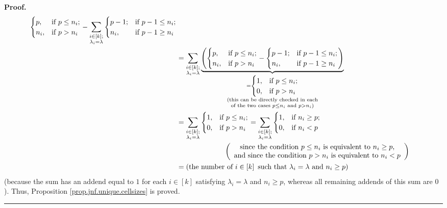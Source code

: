 \documentclass[numbers=enddot,12pt,final,onecolumn,notitlepage]{scrartcl}%
\numberwithin{exer}{subsection}
\theoremstyle{definition}
\newenvironment{proof}[1][Proof]{\noindent\textbf{#1.} }{\ \rule{0.5em}{0.5em}}
\let\sumnonlimits\sum
\renewcommand{\sum}{\sumnonlimits\limits}
\begin{document}
\begin{proof}
\begin{align*}
\begin{cases}
p, & \text{if }p\leq n_{i};\\
n_{i}, & \text{if }p>n_{i}%
\end{cases}
-\sum_{\substack{i\in\left[  k\right]  ;\\\lambda_{i}=\lambda}}%
\begin{cases}
p-1; & \text{if }p-1\leq n_{i};\\
n_{i}, & \text{if }p-1\geq n_{i}%
\end{cases}
\\
&  =\sum_{\substack{i\in\left[  k\right]  ;\\\lambda_{i}=\lambda
}}\underbrace{\left(
\begin{cases}
p, & \text{if }p\leq n_{i};\\
n_{i}, & \text{if }p>n_{i}%
\end{cases}
-%
\begin{cases}
p-1; & \text{if }p-1\leq n_{i};\\
n_{i}, & \text{if }p-1\geq n_{i}%
\end{cases}
\right)  }_{\substack{=%
\begin{cases}
1, & \text{if }p\leq n_{i};\\
0, & \text{if }p>n_{i}%
\end{cases}
\\\text{(this can be directly checked in each}\\\text{of the two cases }p\leq
n_{i}\text{ and }p>n_{i}\text{)}}}\\
&  =\sum_{\substack{i\in\left[  k\right]  ;\\\lambda_{i}=\lambda}}%
\begin{cases}
1, & \text{if }p\leq n_{i};\\
0, & \text{if }p>n_{i}%
\end{cases}
=\sum_{\substack{i\in\left[  k\right]  ;\\\lambda_{i}=\lambda}}%
\begin{cases}
1, & \text{if }n_{i}\geq p;\\
0, & \text{if }n_{i}<p
\end{cases}
\\
&  \ \ \ \ \ \ \ \ \ \ \ \ \ \ \ \ \ \ \ \ \left(
\begin{array}
[c]{c}%
\text{since the condition }p\leq n_{i}\text{ is equivalent to }n_{i}\geq
p\text{,}\\
\text{and since the condition }p>n_{i}\text{ is equivalent to }n_{i}<p
\end{array}
\right) \\
&  =\left(  \text{the number of }i\in\left[  k\right]  \text{ such that
}\lambda_{i}=\lambda\text{ and }n_{i}\geq p\right)
\end{align*}
(because the sum has an addend equal to $1$ for each $i\in\left[  k\right]  $
satisfying $\lambda_{i}=\lambda$ and $n_{i}\geq p$, whereas all remaining
addends of this sum are $0$). Thus, Proposition
\ref{prop.jnf.unique.cellsizes} is proved.
\end{proof}
\end{document}
